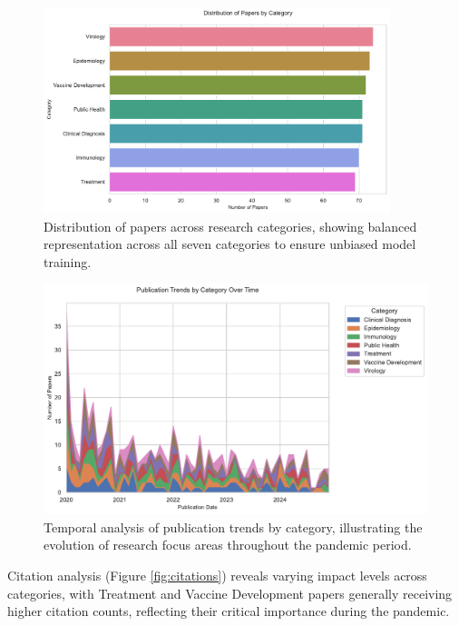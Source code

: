 \documentclass[12pt,a4paper]{article}
\begin{document}
\begin{figure}[H]
    \centering
    \includegraphics[width=0.9\textwidth]{dataset_category_distribution.pdf}
    \caption{Distribution of papers across research categories, showing balanced representation across all seven categories to ensure unbiased model training.}
    \label{fig:category_dist}
\end{figure}

\begin{figure}[H]
    \centering
    \includegraphics[width=\textwidth]{dataset_temporal_analysis.pdf}
    \caption{Temporal analysis of publication trends by category, illustrating the evolution of research focus areas throughout the pandemic period.}
    \label{fig:temporal}
\end{figure}

Citation analysis (Figure \ref{fig:citations}) reveals varying impact levels across categories, with Treatment and Vaccine Development papers generally receiving higher citation counts, reflecting their critical importance during the pandemic.
\end{document}
